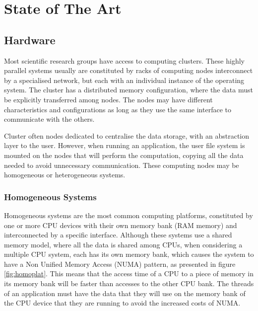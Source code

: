 
\chapter{State of The Art}
\label{state_of_the_art}

\section{Hardware}
\label{hardware}

Most scientific research groups have access to computing clusters. These highly parallel systems usually are constituted by racks of computing nodes interconnect by a specialised network, but each with an individual instance of the operating system. The cluster has a distributed memory configuration, where the data must be explicitly transferred among nodes. The nodes may have different characteristics and configurations as long as they use the same interface to communicate with the others.

Cluster often nodes dedicated to centralise the data storage, with an abstraction layer to the user. However, when running an application, the user file system is mounted on the nodes that will perform the computation, copying all the data needed to avoid unnecessary communication. These computing nodes may be homogeneous or heterogeneous systems.

\subsection{Homogeneous Systems}
\label{homo_systems}

Homogeneous systems are the most common computing platforms, constituted by one or more CPU devices with their own memory bank (RAM memory) and interconnected by a specific interface. Although these systems use a shared memory model, where all the data is shared among CPUs, when considering a multiple CPU system, each has its own memory bank, which causes the system to have a Non Unified Memory Access (NUMA) pattern, as presented in figure \ref{fig:homoplat}. This means that the access time of a CPU to a piece of memory in its memory bank will be faster than accesses to the other CPU bank. The threads of an application must have the data that they will use on the memory bank of the CPU device that they are running to avoid the increased costs of NUMA.

